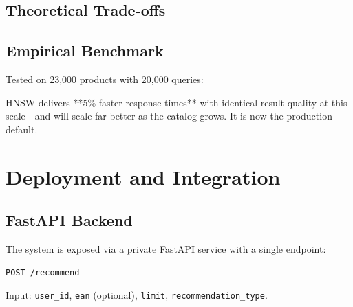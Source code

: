 \subsection{Theoretical Trade-offs}
\begin{table}[H]
\centering
\caption{Exact vs. HNSW search: key differences}
\label{tab:theoretical-comparison}
\end{table}

\subsection{Empirical Benchmark}
Tested on 23,000 products with 20,000 queries:

\begin{table}[H]
\centering
\caption{Performance benchmark}
\label{tab:benchmark-results}
\end{table}

HNSW delivers **5\% faster response times** with identical result quality at this scale—and will scale far better as the catalog grows. It is now the production default.

\section{Deployment and Integration}
\subsection{FastAPI Backend}
The system is exposed via a private FastAPI service with a single endpoint:
\begin{verbatim}
POST /recommend
\end{verbatim}
Input: \texttt{user\_id}, \texttt{ean} (optional), \texttt{limit}, \texttt{recommendation\_type}.

